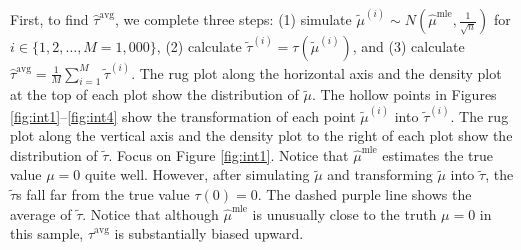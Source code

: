 \documentclass[11pt]{article}
\begin{document}
First, to find $\hat{\tau}^\text{avg}$, we complete three steps: (1) simulate $\tilde{\mu}^{(i)} \sim N \left( \hat{\mu}^\text{mle}, \frac{1}{\sqrt{n}} \right)$ for $i \in \{1, 2,\ldots, M = 1,000\}$, (2) calculate $\tilde{\tau}^{(i)} = \tau\left( \tilde{\mu}^{(i)} \right)$, and (3) calculate $\hat{\tau}^\text{avg} = \frac{1}{M} \sum_{i = 1}^M \tilde{\tau}^{(i)}$.
The rug plot along the horizontal axis and the density plot at the top of each plot show the distribution of $\tilde{\mu}$.
The hollow points in Figures \ref{fig:int1}--\ref{fig:int4} show the transformation of each point $\tilde{\mu}^{(i)}$ into $\tilde{\tau}^{(i)}$.
The rug plot along the vertical axis and the density plot to the right of each plot show the distribution of $\tilde{\tau}$.
Focus on Figure \ref{fig:int1}.
Notice that $\hat{\mu}^\text{mle}$ estimates the true value $\mu = 0$ quite well.
However, after simulating $\tilde{\mu}$ and transforming $\tilde{\mu}$ into $\tilde{\tau}$, the $\tilde{\tau}$s fall far from the true value $\tau(0) = 0$.
The dashed purple line shows the average of $\tilde{\tau}$.
Notice that although $\hat{\mu}^\text{mle}$ is unusually close to the truth $\mu = 0$ in this sample, $\hat{\tau}^\text{avg}$ is substantially biased upward.
\end{document}
